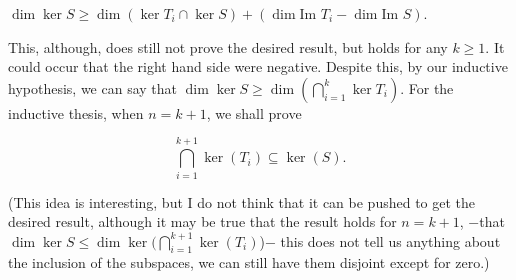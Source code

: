 \documentclass{article}
\theoremstyle{remark}
\begin{document}
\begin{enumerate}
        \begin{center}
            $\dim \ker S \geq \dim (\ker T_i \cap \ker S) + (\dim \text{Im } T_i - \dim \text{Im } S)$.
        \end{center}
        This, although, does still not prove the desired result, but holds for any $k \geq 1$. It could occur that the right hand side were negative.
        Despite this, by our inductive hypothesis, we can say that $\dim \ker S \geq \dim (\bigcap_{i=1}^{k} \ker T_i)$.
        For the inductive thesis, when $n = k+1$, we shall prove
        \begin{center}
            \[
                \bigcap_{i=1}^{k+1} \ker(T_i) \subseteq \ker (S).
            \]
        \end{center}
        (This idea is interesting, but I do not think that it can be pushed to get the desired result, although it may be true that the result holds for $n = k+1$,
        $-$that $\dim \ker S \leq \dim \ker (\bigcap_{i=1}^{k+1} \ker(T_i)$)$-$
        this does not tell us anything about the inclusion of the subspaces, we can still have them disjoint except for zero.)


\end{enumerate}
\end{document}
